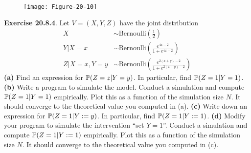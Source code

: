 \begin{figure}[H]
\centering
\texttt{[image: Figure-20-10]}
\end{figure}


\textbf{Exercise 20.8.4}. Let \(V = (X, Y, Z)\) have the joint
distribution
\begin{align*}
X &\sim \text{Bernoulli}\left(\frac{1}{2}\right) \\
Y | X = x &\sim \text{Bernoulli}\left(\frac{e^{4x - 2}}{1 + e^{4x - 2}}\right) \\
Z | X = x, Y = y &\sim \text{Bernoulli}\left(\frac{e^{2(x+y)-2}}{1 + e^{2(x+y)-2}}\right)
\end{align*}
\textbf{(a)} Find an expression for \(\operatorname{\mathbb{P}}(Z = z | Y = y)\). In
particular, find \(\operatorname{\mathbb{P}}(Z = 1 | Y = 1)\).
\textbf{(b)} Write a program to simulate the model. Conduct a simulation
and compute \(\operatorname{\mathbb{P}}(Z = 1 | Y = 1)\) empirically. Plot this as a
function of the simulation size \(N\). It should converge to the
theoretical value you computed in (a).
\textbf{(c)} Write down an expression for
\(\operatorname{\mathbb{P}}(Z = 1 | Y := y)\). In particular, find
\(\operatorname{\mathbb{P}}(Z = 1 | Y := 1)\).
\textbf{(d)} Modify your program to simulate the intervention ``set
\(Y = 1\)''. Conduct a simulation and compute
\(\operatorname{\mathbb{P}}(Z = 1 | Y := 1)\) empirically. Plot this as a function of
the simulation size \(N\). It should converge to the theoretical value
you computed in (c).


